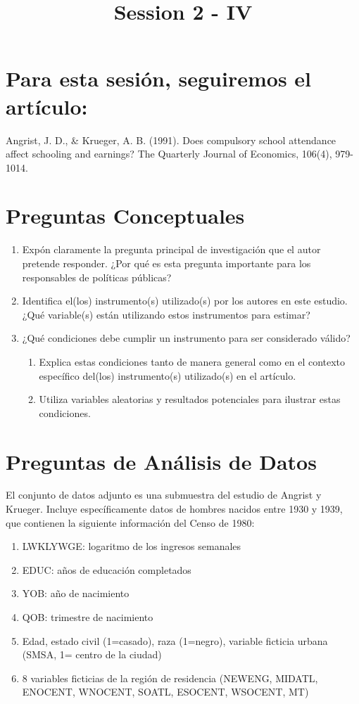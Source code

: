 \documentclass[11pt,a4paper,english]{article}
\title{Session 2 - IV}
\author{}
\date{}
\begin{document}
\maketitle

\section*{Para esta sesión, seguiremos el artículo:}
Angrist, J. D., \& Krueger, A. B. (1991). Does compulsory school attendance affect schooling and earnings? The Quarterly Journal of Economics, 106(4), 979-1014.

\section*{Preguntas Conceptuales}

\begin{enumerate}
    \item Expón claramente la pregunta principal de investigación que el autor pretende responder. ¿Por qué es esta pregunta importante para los responsables de políticas públicas?
    \item Identifica el(los) instrumento(s) utilizado(s) por los autores en este estudio. ¿Qué variable(s) están utilizando estos instrumentos para estimar?
    \item ¿Qué condiciones debe cumplir un instrumento para ser considerado válido?
    \begin{enumerate}
        \item Explica estas condiciones tanto de manera general como en el contexto específico del(los) instrumento(s) utilizado(s) en el artículo.
        \item Utiliza variables aleatorias y resultados potenciales para ilustrar estas condiciones.
    \end{enumerate}
\end{enumerate}

\section*{Preguntas de Análisis de Datos}

El conjunto de datos adjunto es una submuestra del estudio de Angrist y Krueger. Incluye específicamente datos de hombres nacidos entre 1930 y 1939, que contienen la siguiente información del Censo de 1980:
\begin{enumerate}
    \item LWKLYWGE: logaritmo de los ingresos semanales
    \item EDUC: años de educación completados
    \item YOB: año de nacimiento
    \item QOB: trimestre de nacimiento
    \item Edad, estado civil (1=casado), raza (1=negro), variable ficticia urbana (SMSA, 1= centro de la ciudad)
    \item 8 variables ficticias de la región de residencia (NEWENG, MIDATL, ENOCENT, WNOCENT, SOATL, ESOCENT, WSOCENT, MT)
\end{enumerate}
\end{document}
